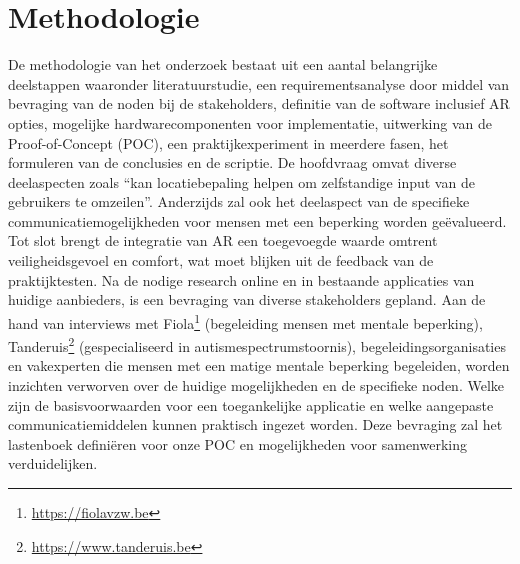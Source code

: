 
\section{Methodologie}%
\label{sec:methodologie}

De methodologie van het onderzoek bestaat uit een aantal belangrijke deelstappen waaronder literatuurstudie, een requirementsanalyse door middel van bevraging van de noden bij de stakeholders, definitie van de software inclusief AR opties, mogelijke hardwarecomponenten voor implementatie, uitwerking van de Proof-of-Concept (POC), een praktijkexperiment in meerdere fasen, het formuleren van de conclusies en de scriptie. De hoofdvraag omvat diverse deelaspecten zoals ``kan locatiebepaling helpen om zelfstandige input van de gebruikers te omzeilen''. Anderzijds zal ook het deelaspect van de specifieke communicatiemogelijkheden voor mensen met een beperking worden geëvalueerd. Tot slot brengt de integratie van AR een toegevoegde waarde omtrent veiligheidsgevoel en comfort, wat moet blijken uit de feedback van de praktijktesten. Na de nodige research online en in bestaande applicaties van huidige aanbieders, is een bevraging van diverse stakeholders gepland. Aan de hand van interviews met Fiola\footnote{\url{https://fiolavzw.be}} (begeleiding mensen met mentale beperking), Tanderuis\footnote{\url{https://www.tanderuis.be}} (gespecialiseerd in autismespectrumstoornis), begeleidingsorganisaties en vakexperten die mensen met een matige mentale beperking begeleiden, worden inzichten verworven over de huidige mogelijkheden en de specifieke noden. Welke zijn de basisvoorwaarden voor een toegankelijke applicatie en welke aangepaste communicatiemiddelen kunnen praktisch ingezet worden. Deze bevraging zal het lastenboek definiëren voor onze POC en mogelijkheden voor samenwerking verduidelijken.

